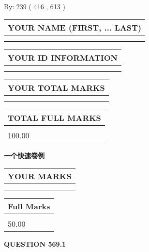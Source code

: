 \documentclass{ctexart}
\begin{document}
   
\hspace{1.0in} By: 
 239 ( 416 ,  613 )
   
   
   
   
\newpage 
\setcounter{page}{ 
   569001 } 
   
   
   
   
\noindent\begin{tabular}{|l|}
\hline
YOUR NAME (FIRST, ... LAST)  \\
\hline
 \\ 
 \\ 
\hline
\end{tabular}
\hspace{0.05in} \begin{tabular}{|l|}
\hline
 YOUR   ID   INFORMATION  \\
\hline
 \\ 
 \\ 
\hline
\end{tabular}
   
   
\vspace{0.2in}\noindent\begin{tabular}{|l|}
\hline
YOUR TOTAL MARKS  \\
\hline
 \\ 
 \\ 
\hline
\end{tabular}
\hspace{0.05in} \begin{tabular}{|l|}
\hline
TOTAL FULL MARKS  \\
\hline
 \\ 
100.00 \\
\hline
\end{tabular}
   
   
 \vspace{0.2in}
{\LARGE {\textbf{ 一个快速卷例}}}
   
   
  
\vspace{0.2in}
  
\noindent\begin{tabular}{|l|}
\hline
 YOUR MARKS  \\
\hline
 \\ 
 \\ 
\hline
\end{tabular}
\hspace{0.05in} \begin{tabular}{|l|}
\hline
 Full Marks  \\
\hline
 \\ 
50.00 \\
\hline
\end{tabular}
{\textbf{\Large{QUESTION
569.1 
}}}
  
\end{document}
